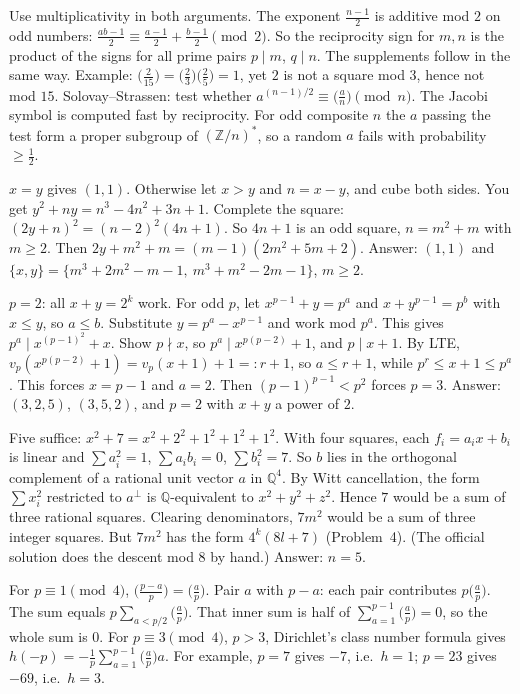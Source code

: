 \documentclass[11pt,a4paper]{article}
\begin{document}
 Use multiplicativity in both arguments. The exponent $\frac{n-1}2$ is additive mod $2$ on odd numbers: $\frac{ab-1}2\equiv\frac{a-1}2+\frac{b-1}2\pmod 2$. So the reciprocity sign for $m,n$ is the product of the signs for all prime pairs $p\mid m$, $q\mid n$. The supplements follow in the same way.
 Example: $\bigl(\frac2{15}\bigr)=\bigl(\frac23\bigr)\bigl(\frac25\bigr)=1$, yet $2$ is not a square mod $3$, hence not mod $15$.
 Solovay--Strassen: test whether $a^{(n-1)/2}\equiv\bigl(\frac an\bigr)\pmod n$. The Jacobi symbol is computed fast by reciprocity. For odd composite $n$ the $a$ passing the test form a proper subgroup of $(\mathbb Z/n)^*$, so a random $a$ fails with probability $\ge\frac12$.

 $x=y$ gives $(1,1)$. Otherwise let $x>y$ and $n=x-y$, and cube both sides. You get $y^2+ny=n^3-4n^2+3n+1$.
 Complete the square: $(2y+n)^2=(n-2)^2(4n+1)$. So $4n+1$ is an odd square, $n=m^2+m$ with $m\ge2$.
 Then $2y+m^2+m=(m-1)(2m^2+5m+2)$. Answer: $(1,1)$ and $\{x,y\}=\{m^3+2m^2-m-1,\ m^3+m^2-2m-1\}$, $m\ge2$.

 $p=2$: all $x+y=2^k$ work. For odd $p$, let $x^{p-1}+y=p^a$ and $x+y^{p-1}=p^b$ with $x\le y$, so $a\le b$. Substitute $y=p^a-x^{p-1}$ and work mod $p^a$.
 This gives $p^a\mid x^{(p-1)^2}+x$. Show $p\nmid x$, so $p^a\mid x^{p(p-2)}+1$, and $p\mid x+1$.
 By LTE, $v_p(x^{p(p-2)}+1)=v_p(x+1)+1=:r+1$, so $a\le r+1$, while $p^r\le x+1\le p^a$. This forces $x=p-1$ and $a=2$. Then $(p-1)^{p-1}<p^2$ forces $p=3$. Answer: $(3,2,5)$, $(3,5,2)$, and $p=2$ with $x+y$ a power of $2$.

 Five suffice: $x^2+7=x^2+2^2+1^2+1^2+1^2$. With four squares, each $f_i=a_ix+b_i$ is linear and $\sum a_i^2=1$, $\sum a_ib_i=0$, $\sum b_i^2=7$.
 So $b$ lies in the orthogonal complement of a rational unit vector $a$ in $\mathbb Q^4$. By Witt cancellation, the form $\sum x_i^2$ restricted to $a^\perp$ is $\mathbb Q$-equivalent to $x^2+y^2+z^2$. Hence $7$ would be a sum of three rational squares.
 Clearing denominators, $7m^2$ would be a sum of three integer squares. But $7m^2$ has the form $4^k(8l+7)$ (Problem~4). (The official solution does the descent mod $8$ by hand.) Answer: $n=5$.

 For $p\equiv1\pmod4$, $\bigl(\frac{p-a}p\bigr)=\bigl(\frac ap\bigr)$. Pair $a$ with $p-a$: each pair contributes $p\bigl(\frac ap\bigr)$.
 The sum equals $p\sum_{a<p/2}\bigl(\frac ap\bigr)$. That inner sum is half of $\sum_{a=1}^{p-1}\bigl(\frac ap\bigr)=0$, so the whole sum is $0$.
 For $p\equiv3\pmod4$, $p>3$, Dirichlet's class number formula gives $h(-p)=-\frac1p\sum_{a=1}^{p-1}\bigl(\frac ap\bigr)a$. For example, $p=7$ gives $-7$, i.e.\ $h=1$; $p=23$ gives $-69$, i.e.\ $h=3$.
\end{document}
